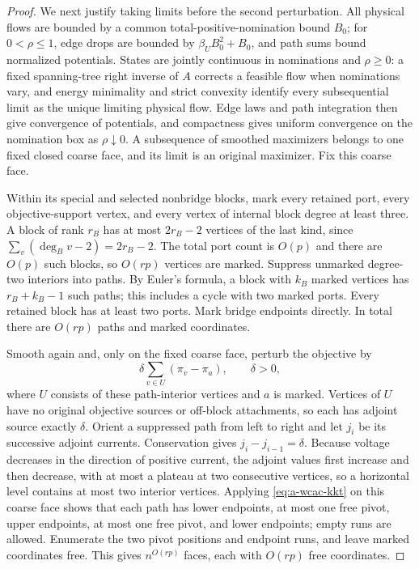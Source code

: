 \begin{proof}
We next justify taking limits before the second perturbation.
All physical flows are bounded by a common total-positive-nomination
bound $B_0$; for $0<\rho\le1$, edge drops are bounded by
$\beta_U B_0^2+B_0$, and path sums bound normalized potentials. States are
jointly continuous in nominations and $\rho\ge0$: a fixed spanning-tree
right inverse of $A$ corrects a feasible flow when nominations vary, and
energy minimality and strict convexity identify every subsequential limit
as the unique limiting physical flow. Edge laws and path integration then
give convergence of potentials, and compactness gives uniform convergence
on the nomination box as $\rho\downarrow0$. A subsequence of smoothed
maximizers belongs to one fixed closed coarse face, and its limit is an
original maximizer. Fix this coarse face.

Within its special and selected nonbridge blocks, mark every retained
port, every objective-support vertex, and every vertex of internal block
degree at least three. A block of rank $r_B$ has at most $2r_B-2$ vertices
of the last kind, since $\sum_v(\deg_Bv-2)=2r_B-2$. The total port count
is $O(p)$ and there are $O(p)$ such blocks, so $O(rp)$ vertices are
marked. Suppress unmarked degree-two interiors into paths. By Euler's
formula, a block with $k_B$ marked vertices has $r_B+k_B-1$ such paths;
this includes a cycle with two marked ports. Every retained block has at
least two ports. Mark bridge endpoints directly. In total there are
$O(rp)$ paths and marked coordinates.

Smooth again and, only on the fixed coarse face, perturb the objective by
\[
 \delta\sum_{v\in U}(\pi_v-\pi_a),\qquad \delta>0,
\]
where $U$ consists of these path-interior vertices and $a$ is marked.
Vertices of $U$ have no original objective sources or off-block
attachments, so each has adjoint source exactly $\delta$.
Orient a suppressed path from left to right and let $j_i$ be its
successive adjoint currents. Conservation gives
$j_i-j_{i-1}=\delta$. Because voltage decreases in the direction of positive
current, the adjoint values first increase and then decrease, with at
most a plateau at two consecutive vertices, so a horizontal level contains
at most two interior vertices. Applying \eqref{eq:a-wcac-kkt} on this
coarse face shows that each path has lower endpoints, at most one free
pivot, upper endpoints, at most one free pivot, and lower endpoints;
empty runs are allowed. Enumerate the two pivot positions and endpoint
runs, and leave marked coordinates free. This gives $n^{O(rp)}$ faces,
each with $O(rp)$ free coordinates.


\end{proof}
